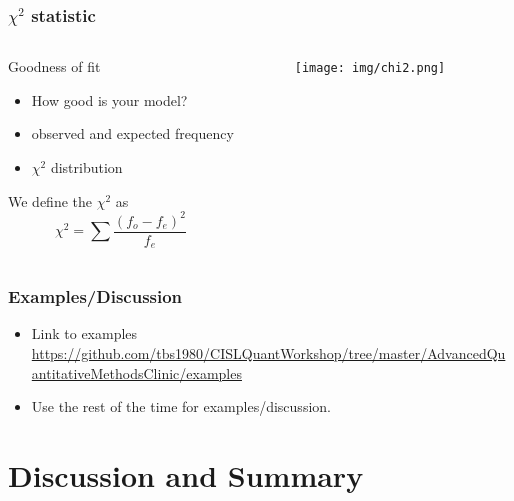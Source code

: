 \documentclass[10pt, compress]{beamer}
\begin{document}
\begin{frame}
    \frametitle{$\chi^2$ statistic}
    \begin{columns}
        \begin{block}{Goodness of fit}
            \begin{itemize}
                \item How good is your model?
                \item observed and expected frequency
                \item $\chi^2$ distribution
            \end{itemize}
            We define the $\chi^2$ as
            \begin{equation}
                \chi^2 = \sum \frac{(f_o-f_e)^2}{f_e}
            \end{equation}
        \end{block}
        \begin{block}{}
            \begin{figure}
                \begin{center}
                    \texttt{[image: img/chi2.png]}
                \end{center}
            \end{figure}
        \end{block}
    \end{columns}
\end{frame}

\begin{frame}
    \frametitle{Examples/Discussion}
    \begin{itemize}
        \item Link to examples \url{https://github.com/tbs1980/CISLQuantWorkshop/tree/master/AdvancedQuantitativeMethodsClinic/examples}
        \item Use the rest of the time for examples/discussion.
    \end{itemize}
\end{frame}

\section{Discussion and Summary}
\end{document}
